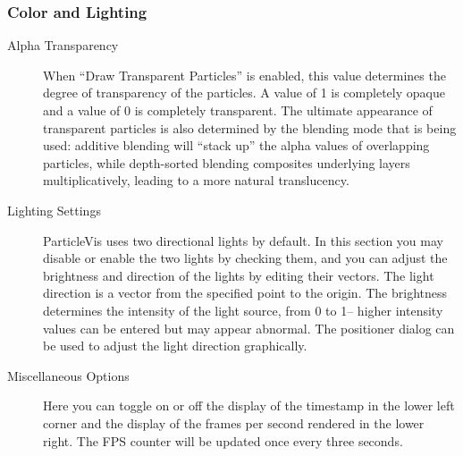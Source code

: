 \subsubsection{Color and Lighting}
\begin{description}
\item[Alpha Transparency]
   When ``Draw Transparent Particles'' is enabled, this value determines the degree of transparency of the particles.  A value of 1 is completely opaque and a value of 0 is completely transparent.  The ultimate appearance of transparent particles is also determined by the blending mode that is being used: additive blending will ``stack up'' the alpha values of overlapping particles, while depth-sorted blending composites underlying layers multiplicatively, leading to a more natural translucency.

\item[Lighting Settings]
ParticleVis uses two directional lights by default.  In this section you may disable or enable the two lights by checking them, and you can adjust the brightness and direction of the lights by editing their vectors.  The light direction is a vector from the specified point to the origin.  The brightness determines the intensity of the light source, from 0 to 1-- higher intensity values can be entered but may appear abnormal.  The positioner dialog can be used to adjust the light direction graphically.

\item[Miscellaneous Options]
Here you can toggle on or off the display of the timestamp in the lower left corner and the display of the frames per second rendered in the lower right.  The FPS counter will be updated once every three seconds.
\end{description}

